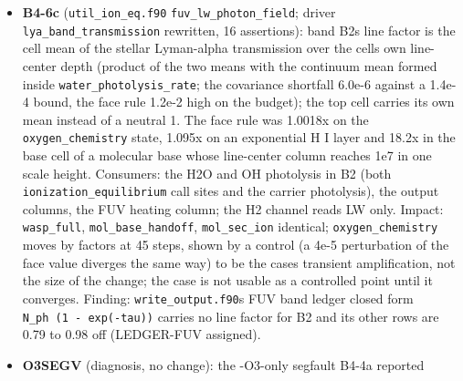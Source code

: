 \documentclass[english,a4paper]{my_memo}
\begin{document}
\begin{itemize}
  division by zero in \texttt{EXHALE\_main.f90} about 1234: \texttt{mod(count,\ n\_err\_every)} with \texttt{n\_err\_every\ =\ 0} in \texttt{init} mode, reached because \texttt{.and.}
  does not short-circuit (\texttt{-O1} and above happen to skip it); fix handed to
  B3c (owner of the file). (2) A real floating-point overflow in
  \texttt{he\_rec\_coupling} (\texttt{util\_ion\_eq.f90:2813}): \texttt{1100\ exp(1.2/T4)\ sqrt(T4)} at
  17 K is 3.9e309, an \texttt{Inf} consumed as \texttt{ne/Inf\ =\ 0} into the correct
  low-density limit; the product is now formed only above \texttt{T4\ =\ 1.71e-3}
  and the limit value taken below, byte-identical on \texttt{hydrostatic\_column},
  \texttt{wasp\_full}, \texttt{mol\_base\_handoff}. A third site of the same class (the
  stall detector\textquotesingle s \texttt{huge} sentinel) also handed to B3c. \texttt{run\_fcheck.sh}
  states why it builds at -O1.
\item
  \textbf{B4-6c} (\texttt{util\_ion\_eq.f90} \texttt{fuv\_lw\_photon\_field}; driver
  \texttt{lya\_band\_transmission} rewritten, 16 assertions): band B2\textquotesingle s line factor is
  the cell mean of the stellar Lyman-alpha transmission over the cell\textquotesingle s own
  line-center depth (product of the two means with the continuum mean formed
  inside \texttt{water\_photolysis\_rate}; the covariance shortfall 6.0e-6 against a
  1.4e-4 bound, the face rule 1.2e-2 high on the budget); the top cell
  carries its own mean instead of a neutral 1. The face rule was 1.0018x on
  the \texttt{oxygen\_chemistry} state, 1.095x on an exponential H I layer and 18.2x
  in the base cell of a molecular base whose line-center column reaches 1e7
  in one scale height. Consumers: the H2O and OH photolysis in B2 (both
  \texttt{ionization\_equilibrium} call sites and the carrier photolysis), the output
  columns, the FUV heating column; the H2 channel reads LW only. Impact:
  \texttt{wasp\_full}, \texttt{mol\_base\_handoff}, \texttt{mol\_sec\_ion} identical; \texttt{oxygen\_chemistry}
  moves by factors at 45 steps, shown by a control (a 4e-5 perturbation of
  the face value diverges the same way) to be the case\textquotesingle s transient
  amplification, not the size of the change; the case is not usable as a
  controlled point until it converges. Finding: \texttt{write\_output.f90}\textquotesingle s FUV band
  ledger closed form \texttt{N\_ph\ (1\ -\ exp(-tau))} carries no line factor for B2 and
  its other rows are 0.79 to 0.98 off (LEDGER-FUV assigned).
\item
  \textbf{O3SEGV} (diagnosis, no change): the -O3-only segfault B4-4a reported

\end{itemize}
\end{document}
